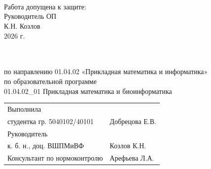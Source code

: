 
\begin{titlepage}
	
	{\titlefont
		
		\begin{center}
			{\ministry} \\
			\university \\
			\department \\[1cm]
		\end{center}
		
		\begin{flushright}
			\begin{minipage}{0.35\textwidth} 
				\begin{flushleft} 
					Работа допущена к защите:\\
					Руководитель ОП \\
					К.Н. Козлов \\
					\guillemetleft \underline{\hspace{0.5cm}} \guillemetright \underline{\hspace{3.25cm}} 2026 г. 
				\end{flushleft}
			\end{minipage}
		\end{flushright}
		
		\vspace{1.25cm}
		
		\begin{center}
			{\bfseries \master} \\[0.5cm]
			{\bfseries \name} \\[0.5cm]
			по направлению 01.04.02 «Прикладная математика и информатика» \\
			по образовательной программе\\
			01.04.02\_01 \guillemetleft Прикладная математика и биоинформатика\guillemetright
		\end{center}
		
		\vspace{1.25cm}
		
		\begin{center}
			\begin{tabular}{p{} p{}}
				Выполнила \\ [0.25cm]
				студентка гр. 5040102/40101 &  Добрецова Е.В. \\[0.5cm]
				Руководитель \\ [0.25cm]
				к. б. н., доц. ВШПМиВФ & Козлов К.Н. \\[0.5cm]
				Консультант по нормоконтролю & Арефьева Л.А.
			\end{tabular}
		\end{center}
		
		\vfill
		
		\begin{center}
			\city \\
			\the\year 
		\end{center}
		
	}
	
\end{titlepage}
